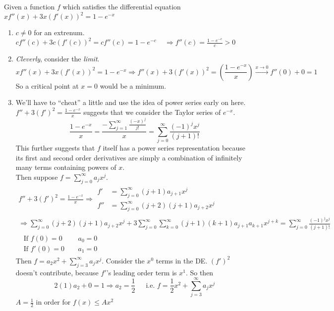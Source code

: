 \documentclass[twoside]{amsart}
\theoremstyle{plain}
\theoremstyle{definition}
\newcommand{\exercisehead}[1]
  {\smallskip
   \noindent{\small\bf Exercise #1.}}
\begin{document}
\exercisehead{31} Given a function $f$ which satisfies the differential equation $xf''(x) + 3x (f'(x))^2 = 1 - e^{-x}$
\begin{enumerate}
\item $c\neq 0 $ for an extrenum.  \\
$cf''(c) + 3 c(f'(c))^2 = cf''(c) = 1 - e^{-c} \quad \, \Longrightarrow f''(c) = \frac{1-e^{-c}}{c} > 0 $
\item \emph{Cleverly}, consider the \emph{limit}.  
\[
  xf''(x) + 3x (f'(x))^2 = 1 - e^{-x} \Longrightarrow f''(x) + 3 (f'(x))^2 = \left( \frac{1-e^{-x}}{x} \right) \xrightarrow{ x \to 0 } f''(0) + 0 = 1 
\]
So a critical point at $x=0$ would be a minimum.  
\item We'll have to ``cheat'' a little and use the idea of power series early on here. \bigskip \\

$f'' + 3(f')^2 = \frac{1-e^{-x}}{x}$ suggests that we consider the Taylor series of $e^{-x}$.  
\[
\frac{1-e^{-x}}{x} = \frac{ - \sum_{j=1}^{\infty} \frac{(-x)^j}{j! } }{ x } = \sum_{j=0}^{\infty} \frac{ (-1)^j x^j }{ (j+1)! }
\]
This further suggests that $f$ itself has a power series representation because its first and second order derivatives are simply a combination of infinitely many terms containing powers of $x$.  \medskip \\
\phantom{ This furt} Then suppose $f = \sum_{j=0}^{\infty} a_j x^j$.  
\[
\begin{gathered}
f'' + 3 (f')^2  = \frac{1-e^{-x}}{x} \Longrightarrow \begin{aligned}
  f' & = \sum_{j=0}^{\infty} (j+1) a_{j+1} x^j \\
  f'' & = \sum_{j=0}^{\infty} (j+2)(j+1) a_{j+2} x^j  
\end{aligned} \\
\Longrightarrow \sum_{j=0}^{\infty} (j+2)(j+1) a_{j+2} x^j + 3 \sum_{j=0}^{\infty} \sum_{k=0}^{\infty} (j+1)(k+1) a_{j+1}a_{k+1} x^{j+k} = \sum_{j=0}^{\infty} \frac{ (-1)^j x^j }{ (j+1)! } \\
\begin{aligned}
  \text{ If } f(0) = 0 & \quad \, a_0 = 0 \\
  \text{ If } f'(0) = 0 & \quad \, a_1 = 0 
\end{aligned} 
\end{gathered}
\]
Then $f = a_2 x^2 + \sum_{j=3}^{\infty} a_j x^j$.  Consider the $x^0$ terms in the DE.  $(f')^2$ doesn't contribute, because $f'$'s leading order term is $x^1$.  So then
\[
2(1) a_2 + 0 = 1 \Longrightarrow \boxed{ a_2 = \frac{1}{2} } \quad \, \text{ i.e. } f = \frac{1}{2} x^2 + \sum_{j=3}^{\infty} a_j x^j 
\]
$\boxed{A = \frac{1}{2}} $ in order for $f(x) \leq Ax^2$
\end{enumerate}
\end{document}
